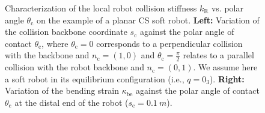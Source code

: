 \begin{figure}[ht]
    \centering
    \caption{Characterization of the local robot collision stiffness $k_\mathrm{R}$ vs. polar angle $\theta_\mathrm{c}$ on the example of a planar \gls{CS} soft robot.
    \textbf{Left:} Variation of the collision backbone coordinate $s_\mathrm{c}$ against the polar angle of contact $\theta_\mathrm{c}$, where $\theta_\mathrm{c} = 0$ corresponds to a perpendicular collision with the backbone and $n_\mathrm{c} = (1, 0)$ and $\theta_\mathrm{c} = \frac{\pi}{2}$ relates to a parallel collision with the robot backbone and $n_\mathrm{c} = (0,1)$. We assume here a soft robot in its equilibrium configuration (i.e., $q = 0_3$).
    \textbf{Right:} Variation of the bending strain $\kappa_\mathrm{be}$ against the polar angle of contact $\theta_\mathrm{c}$ at the distal end of the robot ($s_\mathrm{c} = \SI{0.1}{m}$).
    }
    \label{fig:safetymetric:planar_cs_robot_collision_stiffness_characterization}
\end{figure}


